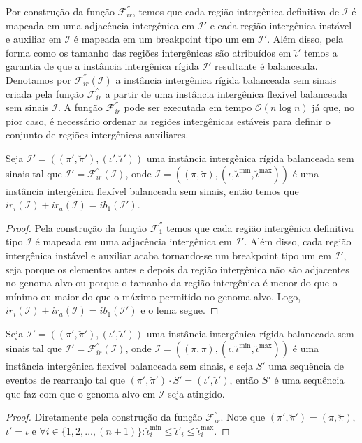 Por construção da função $\mathcal{F}_{ir}^{''}$, temos que cada região intergênica definitiva de $\mathcal{I}$ é mapeada em uma adjacência intergênica em $\mathcal{I}'$ e cada região intergênica instável e auxiliar em $\mathcal{I}$ é mapeada em um breakpoint tipo um em $\mathcal{I}'$. Além disso, pela forma como os tamanho das regiões intergênicas são atribuídos em $\breve\iota'$ temos a garantia de que a instância intergênica rígida $\mathcal{I}'$ resultante é balanceada. Denotamos por $\mathcal{F}_{ir}^{''}(\mathcal{I})$ a instância intergênica rígida balanceada sem sinais criada pela função $\mathcal{F}_{ir}^{''}$ a partir de uma instância intergênica flexível balanceada sem sinais $\mathcal{I}$. A função $\mathcal{F}_{ir}^{''}$ pode ser executada em tempo $\mathcal{O}(n\log n)$ já que, no pior caso, é necessário ordenar as regiões intergênicas estáveis para definir o conjunto de regiões intergênicas auxiliares.

\begin{lemma}\label{lemma:KPGCUTDM}
Seja $\mathcal{I'} = ((\pi',\breve\pi'),(\iota',\breve\iota'))$ uma instância intergênica rígida balanceada sem sinais tal que $\mathcal{I'} = \mathcal{F}_{ir}^{''}(\mathcal{I})$, onde $\mathcal{I} = ((\pi,\breve\pi),(\iota,\breve\iota^{\min},\breve\iota^{\max}))$ é uma instância intergênica flexível balanceada sem sinais, então temos que $ir_i(\mathcal{I}) + ir_a(\mathcal{I}) = ib_1(\mathcal{I'})$.
\end{lemma}
\begin{proof}
Pela construção da função $\mathcal{F}_{1}^{''}$ temos que cada região intergênica definitiva tipo $\mathcal{I}$ é mapeada em uma adjacência intergênica em $\mathcal{I'}$. Além disso, cada região intergênica instável e auxiliar acaba tornando-se um breakpoint tipo um em $\mathcal{I'}$, seja porque os elementos antes e depois da região intergênica não são adjacentes no genoma alvo ou porque o tamanho da região intergênica é menor do que o mínimo ou maior do que o máximo permitido no genoma alvo. Logo, $ir_i(\mathcal{I}) + ir_a(\mathcal{I}) = ib_1(\mathcal{I'})$ e o lema segue.
\end{proof}

\begin{lemma}\label{lemma:KIVEWTOR}
Seja $\mathcal{I'} = ((\pi',\breve\pi'),(\iota',\breve\iota'))$ uma instância intergênica rígida balanceada sem sinais tal que $\mathcal{I'} = \mathcal{F}_{ir}^{''}(\mathcal{I})$, onde $\mathcal{I} = ((\pi,\breve\pi),(\iota,\breve\iota^{\min},\breve\iota^{\max}))$ é uma instância intergênica flexível balanceada sem sinais, e seja $S'$ uma sequência de eventos de rearranjo tal que $(\pi',\breve\pi') \cdot S' = (\iota',\breve\iota')$, então $S'$ é uma sequência que faz com que o genoma alvo em $\mathcal{I}$ seja atingido.
\end{lemma}
\begin{proof}
Diretamente pela construção da função $\mathcal{F}_{ir}^{''}$. Note que $(\pi',\breve\pi') = (\pi,\breve\pi)$, $\iota' = \iota$ e $\forall i \in \{1,2,\dots,({n+1})\}: \breve\iota^{\min}_i \le \breve\iota'_i \le \breve\iota^{\max}_i$.
\end{proof}

